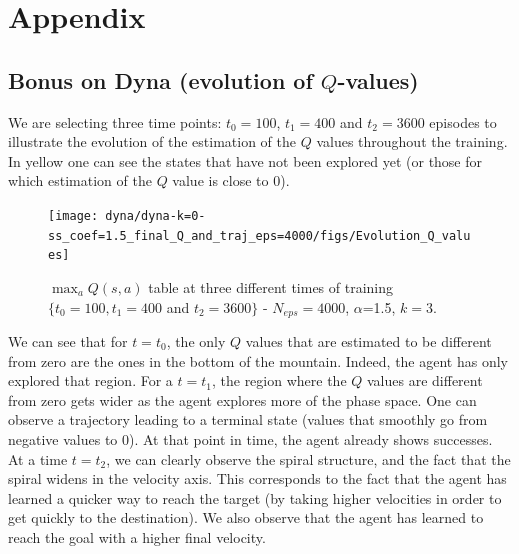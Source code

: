 \documentclass[a4paper, 12pt,oneside]{article}
\begin{document}
        \section{Appendix}
        \subsection{Bonus on Dyna (evolution of $Q$-values)}
        We are selecting three time points: $t_0=100$, $t_1=400$ and $t_2=3600$ episodes to illustrate the evolution of the estimation of the $Q$ values throughout the training. In yellow one can see the states that have not been explored yet (or those for which estimation of the $Q$ value is close to 0).
        \begin{figure}[h]
            \centering
            \texttt{[image: dyna/dyna-k=0-ss\_coef=1.5\_final\_Q\_and\_traj\_eps=4000/figs/Evolution\_Q\_values]}
            \caption{$\max_a Q(s,a)$ table at three different times of training $\{t_0=100,t_1=400$ and $t_2=3600\}$ - $N_{eps}=4000$, $\alpha$=1.5, $k=3$.}
            \label{Qmatrixcounts}
        \end{figure}

        We can see that for $t=t_0$, the only $Q$ values that are estimated to be different from zero are the ones in the bottom of the mountain. Indeed, the agent has only explored that region. For a $t=t_1$, the region where the $Q$ values are different from zero gets wider as the agent explores more of the phase space. One can observe a trajectory leading to a terminal state (values that smoothly go from negative values to 0). At that point in time, the agent already shows successes. At a time $t=t_2$, we can clearly observe the spiral structure, and the fact that the spiral widens in the velocity axis. This corresponds to the fact that the agent has learned a quicker way to reach the target (by taking higher velocities in order to get quickly to the destination). We also observe that the agent has learned to reach the goal with a higher final velocity.
        
\end{document}
